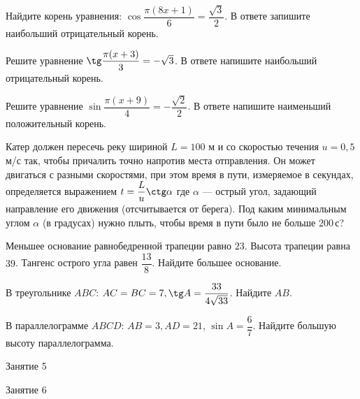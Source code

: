 \begin{homework}[number=2]
	\begin{listofex}
		\item Найдите корень уравнения: \( \cos \dfrac{ \pi(8x+1) }{ 6 } = \dfrac{ \sqrt{3} }{ 2 } \). В ответе запишите наибольший отрицательный корень.
		\item Решите уравнение \( \tg \dfrac{ \pi(x+3) }{ 3 }=-\sqrt{3} \). В ответе напишите наибольший отрицательный корень.
		\item Решите уравнение \( \sin \dfrac{ \pi(x+9) }{ 4 }=-\dfrac{ \sqrt{2} }{ 2 } \). В ответе напишите наименьший положительный корень.
		\item Катер должен пересечь реку шириной \(L = 100\) м и со скоростью течения \(u =0,5\) м/с так, чтобы причалить точно напротив места отправления. Он может двигаться с разными скоростями, при этом время в пути, измеряемое в секундах, определяется выражением \(t=\dfrac{ L }{ u } \ctg \alpha \) где \(\alpha\) --- острый угол, задающий направление его движения (отсчитывается от берега). Под каким минимальным углом \(\alpha\) (в градусах) нужно плыть, чтобы время в пути было не больше \(200\) с?
		\item Меньшее основание равнобедренной трапеции равно \(23\). Высота трапеции равна \(39\). Тангенс острого угла равен \(\dfrac{ 13 }{ 8 }\). Найдите большее основание.
		\item В треугольнике \(ABC\): \(AC=BC=7, \tg A = \dfrac{ 33 }{ 4\sqrt{33} }\). Найдите \(AB\).
		\item В параллелограмме \(ABCD \): \( AB  =  3, AD  =  21\), \( \sin A = \dfrac{ 6 }{ 7 } \). Найдите большую высоту параллелограмма.
	\end{listofex}
\end{homework}

\begin{class}[number=5]
	\begin{listofex}
		\item Занятие 5
	\end{listofex}
\end{class}

\begin{class}[number=6]
	\begin{listofex}
		\item Занятие 6
	\end{listofex}
\end{class}

